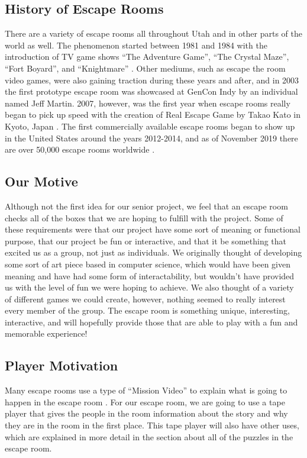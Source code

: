 \documentclass[conference]{IEEEtran}
\begin{document}
\subsection*{History of Escape Rooms}
There are a variety of escape rooms all throughout Utah and in other parts of the world as well. The phenomenon
started between 1981 and 1984 with the introduction of TV game shows ``The Adventure Game'', ``The Crystal Maze'',
``Fort Boyard'', and ``Knightmare'' \cite{wikipediaEscapeRoom}. Other mediums, such as escape the room video games, were also gaining traction
during these years and after, and in 2003 the first prototype escape room was showcased at GenCon Indy by
an individual named Jeff Martin. 2007, however, was the first year when escape rooms really began to pick up speed
with the creation of Real Escape Game by Takao Kato in Kyoto, Japan \cite{whatIsAnEscapeRoom}. The first commercially available escape rooms
began to show up in the United States around the years 2012-2014, and as of November 2019 there are over 50,000 escape
rooms worldwide \cite{wikipediaEscapeRoom}.

\subsection*{Our Motive}
Although not the first idea for our senior project, we feel that an escape room checks all of the
boxes that we are hoping to fulfill with the project. Some of these requirements were that our project
have some sort of meaning or functional purpose, that our project be fun or interactive, and that
it be something that excited us as a group, not just as individuals. We originally thought of developing some
sort of art piece based in computer science, which would have been given meaning and have had some form of
interactability, but wouldn't have provided us with the level of fun we were hoping to achieve.
We also thought of a variety of different games we could create, however, nothing seemed to really interest
every member of the group. The escape room is something unique, interesting, interactive, and will hopefully
provide those that are able to play with a fun and memorable experience!

\subsection*{Player Motivation}
Many escape rooms use a type of ``Mission Video'' to explain what is going to happen in the escape room \cite{whatIsAnEscapeRoom}.
For our escape room, we are going to use a tape player that gives the people in the room information about
the story and why they are in the room in the first place. This tape player will also have other uses, which are
explained in more detail in the section about all of the puzzles in the escape room.
\end{document}
